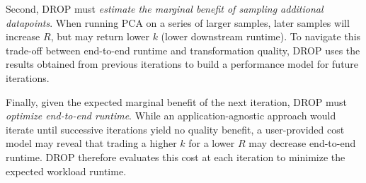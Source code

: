 Second, DROP must \emph{estimate the marginal benefit of sampling additional datapoints}.
When running PCA on a series of larger samples, later samples will increase $R$, but may return lower $k$ (lower downstream runtime). 
To navigate this trade-off between end-to-end runtime and transformation quality, DROP uses the results obtained from previous iterations to build a  performance model for future iterations.


Finally, given the expected marginal benefit of the next iteration, DROP must \emph{optimize end-to-end runtime}.
While an application-agnostic approach would iterate until successive iterations yield no quality benefit, a user-provided cost model may reveal that trading a higher $k$ for a lower $R$ may decrease end-to-end runtime.
DROP therefore evaluates this cost at each iteration
to minimize the expected workload runtime.


